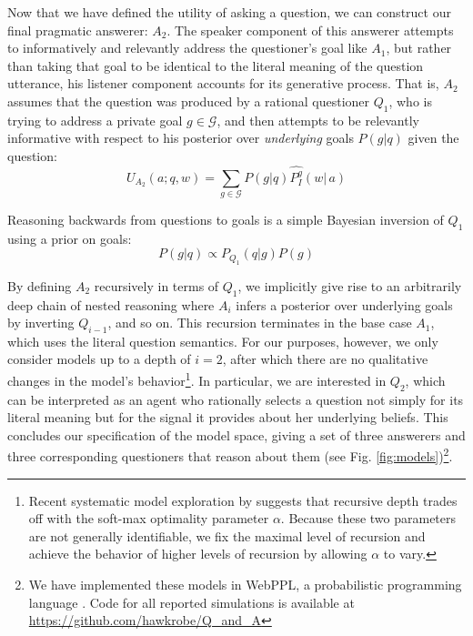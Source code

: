 \documentclass[12pt, floatsintext, jou]{apa6}
\begin{document}
Now that we have defined the utility of asking a question, we can construct our final pragmatic answerer: $A_2$. The speaker component of this answerer attempts to informatively and relevantly address the questioner's goal like $A_1$, but rather than taking that goal to be identical to the literal meaning of the question utterance, his listener component accounts for its generative process. That is, $A_2$ assumes that the question was produced by a rational questioner $Q_1$, who is trying to address a private goal $g \in \mathcal{G}$, and then attempts to be relevantly informative with respect to his posterior over \emph{underlying} goals $P(g|q)$ given the question:
$$U_{A_2}(a; q, w) = \sum_{g \in \mathcal{G}} P(g|q) \widehat{P^g_I}(w|\,a)$$

%
Reasoning backwards from questions to goals is a simple Bayesian inversion of $Q_1$ using a prior on goals:
$$
P(g|q) \propto P_{Q_1}(q|g)P(g)
$$

By defining $A_2$ recursively in terms of $Q_1$, we implicitly give rise to an arbitrarily deep chain of nested reasoning where $A_{i}$ infers a posterior over underlying goals by inverting $Q_{i-1}$, and so on. This recursion terminates in the base case $A_1$, which uses the literal question semantics. For our purposes, however, we only consider models up to a depth of $i=2$, after which there are no qualitative changes in the model's behavior\footnote{Recent systematic model exploration by  suggests that recursive depth trades off with the soft-max optimality parameter $\alpha$. Because these two parameters are not generally identifiable, we fix the maximal level of recursion and achieve the behavior of higher levels of recursion by allowing $\alpha$ to vary.}. In particular, we are interested in $Q_2$, which can be interpreted as an agent who rationally selects a question not simply for its literal meaning but for the signal it provides about her underlying beliefs. This concludes our specification of the model space, giving a set of three answerers and three corresponding questioners that reason about them (see Fig. \ref{fig:models})\footnote{We have implemented these models in WebPPL, a probabilistic programming language \cite{GoodmanStuhlmuller14_DIPPL}. Code for all reported simulations is available at \url{https://github.com/hawkrobe/Q\_and\_A}}.
 
\end{document}
